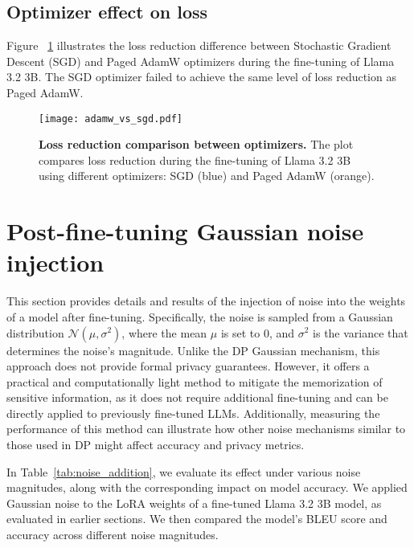 \subsection{Optimizer effect on loss}
Figure ~\ref{fig:adamw_vs_sgd} illustrates the loss reduction difference between Stochastic Gradient Descent (SGD) and Paged AdamW optimizers during the fine-tuning of Llama 3.2 3B. The SGD optimizer failed to achieve the same level of loss reduction as Paged AdamW.
\label{sec:adamw_vs_sgd}
\begin{figure}[ht]
\vskip 0.2in
\begin{center}
\centerline{\texttt{[image: adamw\_vs\_sgd.pdf]}}
\caption{\textbf{Loss reduction comparison between optimizers.} The plot compares loss reduction during the fine-tuning of Llama 3.2 3B using different optimizers: SGD (blue) and Paged AdamW (orange).}
\label{fig:adamw_vs_sgd}
\end{center}
\vskip -0.2in
\end{figure}

\section{Post-fine-tuning Gaussian noise injection}
\label{sec:noise_injection}
This section provides details and results of the injection of noise into the weights of a model after fine-tuning. Specifically, the noise is sampled from a Gaussian distribution $\mathcal{N}(\mu, \sigma^2)$, where the mean $\mu$ is set to 0, and $\sigma^2$ is the variance that determines the noise's magnitude. Unlike the DP Gaussian mechanism, this approach does not provide formal privacy guarantees. However, it offers a practical and computationally light method to mitigate the memorization of sensitive information, as it does not require additional fine-tuning and can be directly applied to previously fine-tuned LLMs. Additionally, measuring the performance of this method can illustrate how other noise mechanisms similar to those used in DP might affect accuracy and privacy metrics.

In Table~\ref{tab:noise_addition}, we evaluate its effect under various noise magnitudes, along with the corresponding impact on model accuracy. We applied Gaussian noise to the LoRA weights of a fine-tuned Llama 3.2 3B model, as evaluated in earlier sections. We then compared the model's BLEU score and accuracy across different noise magnitudes.

